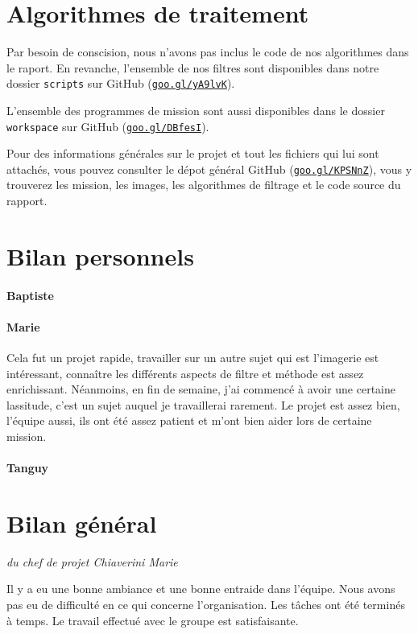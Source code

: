 \documentclass[12pt]{article}
\begin{document}
\section{Algorithmes de traitement}

Par besoin de conscision, nous n'avons pas inclus le code de nos algorithmes dans le raport. En revanche, l'ensemble de nos filtres sont disponibles dans notre dossier \texttt{scripts} sur GitHub (\href{https://github.com/Exia-epickiwi/exolife/tree/master/scripts}{\texttt{goo.gl/yA9lvK}}).

L'ensemble des programmes de mission sont aussi disponibles dans le dossier \texttt{workspace} sur GitHub (\href{https://github.com/Exia-epickiwi/exolife/tree/master/workspace}{\texttt{goo.gl/DBfesI}}).

Pour des informations générales sur le projet et tout les fichiers qui lui sont attachés, vous pouvez consulter le dépot général GitHub (\href{https://github.com/Exia-epickiwi/exolife}{\texttt{goo.gl/KPSNnZ}}), vous y trouverez les mission, les images, les algorithmes de filtrage et le code source du rapport.

\section{Bilan personnels}

\paragraph{ Baptiste}
\paragraph{ Marie}

Cela fut un projet rapide, travailler sur un autre sujet qui est l'imagerie est intéressant, connaître les différents aspects de filtre et méthode est assez enrichissant. Néanmoins, en fin de semaine, j'ai commencé à avoir une certaine lassitude, c'est un sujet auquel je travaillerai rarement. Le projet est assez bien, l'équipe aussi, ils ont été assez patient et m'ont bien aider lors de certaine mission.
\paragraph{ Tanguy}

\section{Bilan général}
\vspace{-0.5cm}\hspace{0.5cm}\textit{du chef de projet Chiaverini Marie}
\vspace{0.5cm}

Il y a eu une bonne ambiance et une bonne entraide dans l'équipe. Nous avons pas eu de difficulté en ce qui concerne l'organisation. Les tâches ont été terminés à temps. Le travail effectué avec le groupe est satisfaisante.
\end{document}

